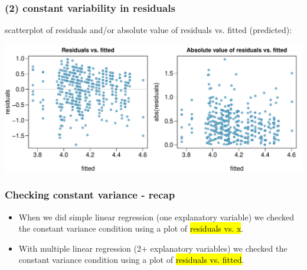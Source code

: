 
\begin{frame}
\frametitle{(2) constant variability in residuals}

scatterplot of residuals and/or absolute value of residuals vs. fitted (predicted): \\

\begin{center}
\includegraphics[width=\textwidth]{8-3_model_cond/figures/beauty/homo_res}
\end{center}


\end{frame}


\begin{frame}
\frametitle{Checking constant variance - recap}

\begin{itemize}

\item When we did simple linear regression (one explanatory variable) we checked the constant variance condition using a plot of \hl{residuals vs. x}.

\item With multiple linear regression (2+ explanatory variables) we checked the constant variance condition using a plot of \hl{residuals vs. fitted}. 

\end{itemize}

$\:$ \\



\end{frame}

